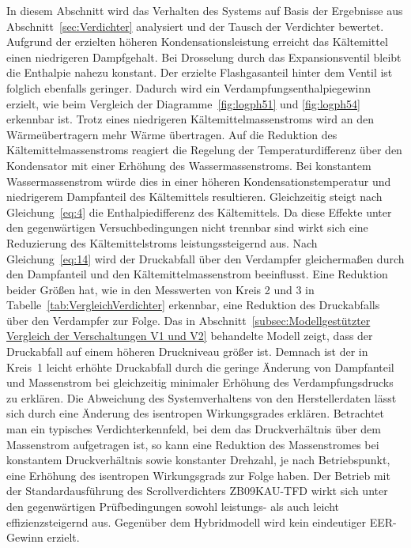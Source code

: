 In diesem Abschnitt wird das Verhalten des Systems auf Basis der Ergebnisse aus Abschnitt~\ref{sec:Verdichter} analysiert und der Tausch der Verdichter bewertet. 
Aufgrund der erzielten höheren Kondensationsleistung erreicht das Kältemittel einen niedrigeren Dampfgehalt. Bei Drosselung durch das Expansionsventil bleibt die Enthalpie nahezu konstant. Der erzielte Flashgasanteil hinter dem Ventil ist folglich ebenfalls geringer. Dadurch wird ein Verdampfungsenthalpiegewinn erzielt, wie beim Vergleich der Diagramme~\ref{fig:logph51} und \ref{fig:logph54} erkennbar ist. Trotz eines niedrigeren Kältemittelmassenstroms wird an den Wärmeübertragern mehr Wärme übertragen. Auf die Reduktion des Kältemittelmassenstroms reagiert die Regelung der Temperaturdifferenz über den Kondensator mit einer Erhöhung des Wassermassenstroms. Bei konstantem Wassermassenstrom würde dies in einer höheren Kondensationstemperatur und niedrigerem Dampfanteil des Kältemittels resultieren. 
Gleichzeitig steigt nach Gleichung~\ref{eq:4} die Enthalpiedifferenz des Kältemittels.
Da diese Effekte unter den gegenwärtigen Versuchbedingungen nicht trennbar sind wirkt sich eine Reduzierung des Kältemittelstroms leistungssteigernd aus.
\newline
Nach Gleichung~\ref{eq:14} wird der Druckabfall über den Verdampfer gleichermaßen durch den Dampfanteil und den Kältemittelmassenstrom beeinflusst. Eine Reduktion beider Größen hat, wie in den Messwerten von Kreis 2 und 3 in Tabelle~\ref{tab:VergleichVerdichter} erkennbar, eine Reduktion des Druckabfalls über den Verdampfer zur Folge. Das in Abschnitt~\ref{subsec:Modellgestützter Vergleich der Verschaltungen V1 und V2} behandelte Modell zeigt, dass der Druckabfall auf einem höheren Druckniveau größer ist. Demnach ist der in Kreis~1 leicht erhöhte Druckabfall durch die geringe Änderung von Dampfanteil und Massenstrom bei gleichzeitig minimaler Erhöhung des Verdampfungsdrucks zu erklären. \newline
Die Abweichung des Systemverhaltens von den Herstellerdaten lässt sich durch eine Änderung des isentropen Wirkungsgrades erklären. Betrachtet man ein typisches Verdichterkennfeld, bei dem das Druckverhältnis über dem Massenstrom aufgetragen ist, so kann eine Reduktion des Massenstromes bei konstantem Druckverhältnis sowie konstanter Drehzahl, je nach Betriebspunkt, eine Erhöhung des isentropen Wirkungsgrads zur Folge haben. 
Der Betrieb mit der Standardausführung des Scrollverdichters ZB09KAU-TFD wirkt sich unter den gegenwärtigen Prüfbedingungen sowohl leistungs- als auch leicht effizienzsteigernd aus. Gegenüber dem Hybridmodell wird kein eindeutiger EER-Gewinn erzielt.


